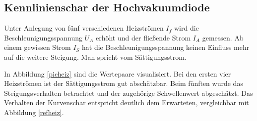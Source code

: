 \subsection{Kennlinienschar der Hochvakuumdiode}
\label{a}
Unter Anlegung von fünf verschiedenen Heizströmen $I_f$ wird die Beschleunigungsspannung $U_A$ erhöht und der fließende Strom $I_A$ 
gemessen. Ab einem gewissen Strom $I_S$ hat die Beschleunigungsspannung keinen Einfluss mehr auf die weitere Steigung. Man spricht vom
Sättigungsstrom.

In Abbildung \ref{picheiz} sind die Wertepaare visualisiert. Bei den ersten vier Heizströmen ist der Sättigungsstrom gut abschätzbar.
Beim fünften wurde das Steigungsverhalten betrachtet und der zugehörige Schwellenwert abgeschätzt. Das Verhalten der Kurvenschar 
entspricht deutlich dem Erwarteten, vergleichbar mit Abbildung \ref{refheiz}.


